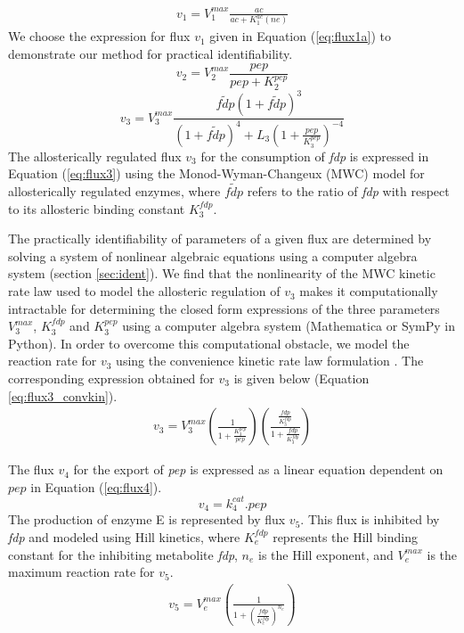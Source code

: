 \documentclass[10pt]{article}
\begin{document}
\begin{align}\label{eq:flux1a}
v_1 = V_1^{max}\frac{ac}{ac+K_{1}^{ac}(ne)}
\end{align}		
We choose the expression for flux $v_1$ given in Equation (\ref{eq:flux1a}) to demonstrate our method for practical identifiability. 	
\begin{equation}\label{eq:flux2}
v_2 = V_{2}^{max}\frac{pep}{pep+K_{2}^{pep}}
\end{equation}
\begin{equation}\label{eq:flux3}
v_3 = V_{3}^{max}\frac{\tilde{fdp}\left(1+\tilde{fdp}\right)^3}{\left(1+\tilde{fdp}\right)^4+L_3\left(1+\frac{pep}{K_{3}^{pep}}\right)^{-4}}
\end{equation}
The allosterically regulated flux $v_3$ for the consumption of \textit{fdp} is expressed in Equation (\ref{eq:flux3}) using the Monod-Wyman-Changeux (MWC) model for allosterically regulated enzymes, where $\tilde{fdp}$ refers to the ratio of \textit{fdp} with respect to its allosteric binding constant $K_{3}^{fdp}$. 

The practically identifiability of parameters of a given flux are determined by solving a system of nonlinear algebraic equations using a computer algebra system (section \ref{sec:ident}). We find that the nonlinearity of the MWC kinetic rate law used to model the allosteric regulation of $v_3$ makes it computationally intractable for determining the closed form expressions of the three parameters $V_3^{max}$, $K_3^{fdp}$ and $K_3^{pep}$ using a computer algebra system (Mathematica or SymPy in Python). In order to overcome this computational obstacle, we model the reaction rate for $v_3$ using the convenience kinetic rate law formulation \parencite{Liebermeister2006}. The corresponding expression obtained for $v_3$ is given below (Equation \ref{eq:flux3_convkin}). 	
\begin{align}\label{eq:flux3_convkin}
v_3 = V_3^{max}\left(\frac{1}{1 + \frac{K_3^{pep}}{pep}}\right)\left(\frac{\frac{fdp}{K_3^{fdp}}}{1 + \frac{fdp}{K_3^{fdp}}}\right)
\end{align}	

The flux $v_4$ for the export of \textit{pep} is expressed as a linear equation dependent on $pep$ in Equation (\ref{eq:flux4}).
\begin{equation}\label{eq:flux4}
v_4 = k_{4}^{cat}.pep
\end{equation}		
The production of enzyme E is represented by flux $v_5$. This flux is inhibited by \textit{fdp} and modeled using Hill kinetics, where $K_e^{fdp}$ represents the Hill binding constant for the inhibiting metabolite \textit{fdp}, $n_e$ is the Hill exponent, and $V_e^{max}$ is the maximum reaction rate for $v_5$.
\begin{align}\label{eq:flux5}
v_5 = V_e^{max}\left(\frac{1}{1+\left(\frac{fdp}{K_{e}^{fdp}}\right)^{n_e}}\right)
\end{align}
\end{document}
